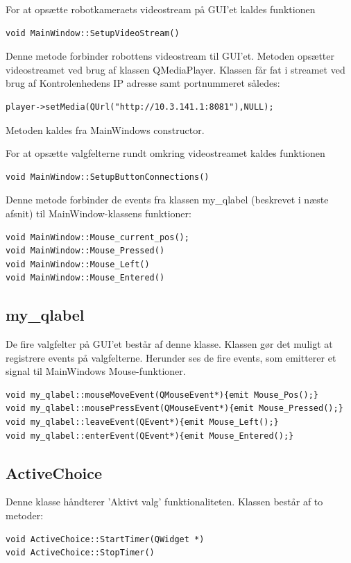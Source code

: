 For at opsætte robotkameraets videostream på GUI'et kaldes funktionen 
\begin{lstlisting}
void MainWindow::SetupVideoStream()
\end{lstlisting}

Denne metode forbinder robottens videostream til GUI'et. 
Metoden opsætter videostreamet ved brug af klassen QMediaPlayer. 
Klassen får fat i streamet ved brug af Kontrolenhedens IP adresse samt portnummeret således:
\begin{lstlisting}
player->setMedia(QUrl("http://10.3.141.1:8081"),NULL);
\end{lstlisting}

Metoden kaldes fra MainWindows constructor.

For at opsætte valgfelterne rundt omkring videostreamet kaldes funktionen 
\begin{lstlisting}
void MainWindow::SetupButtonConnections()
\end{lstlisting}

Denne metode forbinder de events fra klassen my\_qlabel (beskrevet i næste afsnit) til MainWindow-klassens funktioner: 
\begin{lstlisting}
void MainWindow::Mouse_current_pos();
void MainWindow::Mouse_Pressed()
void MainWindow::Mouse_Left()
void MainWindow::Mouse_Entered()
\end{lstlisting}
\newpage
\subsection{my\_qlabel}
De fire valgfelter på GUI'et består af denne klasse. Klassen gør det muligt at registrere events på valgfelterne. 
Herunder ses de fire events, som emitterer et signal til MainWindows Mouse-funktioner.

\begin{lstlisting}
void my_qlabel::mouseMoveEvent(QMouseEvent*){emit Mouse_Pos();}
void my_qlabel::mousePressEvent(QMouseEvent*){emit Mouse_Pressed();}
void my_qlabel::leaveEvent(QEvent*){emit Mouse_Left();}
void my_qlabel::enterEvent(QEvent*){emit Mouse_Entered();}
\end{lstlisting}

\subsection{ActiveChoice}
Denne klasse håndterer 'Aktivt valg' funktionaliteten. Klassen består af to metoder: 
\begin{lstlisting}
void ActiveChoice::StartTimer(QWidget *)
void ActiveChoice::StopTimer()
\end{lstlisting}

